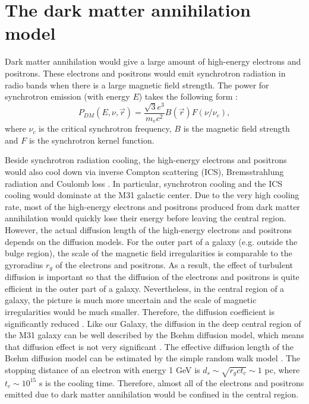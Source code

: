 \documentclass[useAMS,usenatbib]{mn2e}
\begin{document}
\section{The dark matter annihilation model}
Dark matter annihilation would give a large amount of high-energy electrons and positrons. These electrons and positrons would emit synchrotron radiation in radio bands when there is a large magnetic field strength. The power for synchrotron emission (with energy $E$) takes the following form \citep{Aloisio,Profumo}:
\begin{equation}
P_{DM}(E,\nu,\vec{r})=\frac{\sqrt{3}e^3}{m_ec^2}B(\vec{r})F(\nu/\nu_c),
\end{equation}
where $\nu_c$ is the critical synchrotron frequency, $B$ is the magnetic field strength and $F$ is the synchrotron kernel function. 

Beside synchrotron radiation cooling, the high-energy electrons and positrons would also cool down via inverse Compton scattering (ICS), Bremsstrahlung radiation and Coulomb loss \citep{Colafrancesco,Egorov}. In particular, synchrotron cooling and the ICS cooling would dominate at the M31 galactic center. Due to the very high cooling rate, most of the high-energy electrons and positrons produced from dark matter annihilation would quickly lose their energy before leaving the central region. However, the actual diffusion length of the high-energy electrons and positrons depends on the diffusion models. For the outer part of a galaxy (e.g. outside the bulge region), the scale of the magnetic field irregularities is comparable to the gyroradius $r_g$ of the electrons and positrons. As a result, the effect of turbulent diffusion is important so that the diffusion of the electrons and positrons is quite efficient in the outer part of a galaxy. Nevertheless, in the central region of a galaxy, the picture is much more uncertain and the scale of magnetic irregularities would be much smaller. Therefore, the diffusion coefficient is significantly reduced \citep{Regis}. Like our Galaxy, the diffusion in the deep central region of the M31 galaxy can be well described by the B\oe hm diffusion model, which means that diffusion effect is not very significant \citep{Regis}. The effective diffusion length of the B\oe hm diffusion model can be estimated by the simple random walk model \citep{Boehm}. The stopping distance of an electron with energy 1 GeV is $d_s \sim \sqrt{r_gct_c} \sim 1$ pc, where $t_c \sim 10^{15}$ s is the cooling time. Therefore, almost all of the electrons and positrons emitted due to dark matter annihilation would be confined in the central region.
\end{document}
